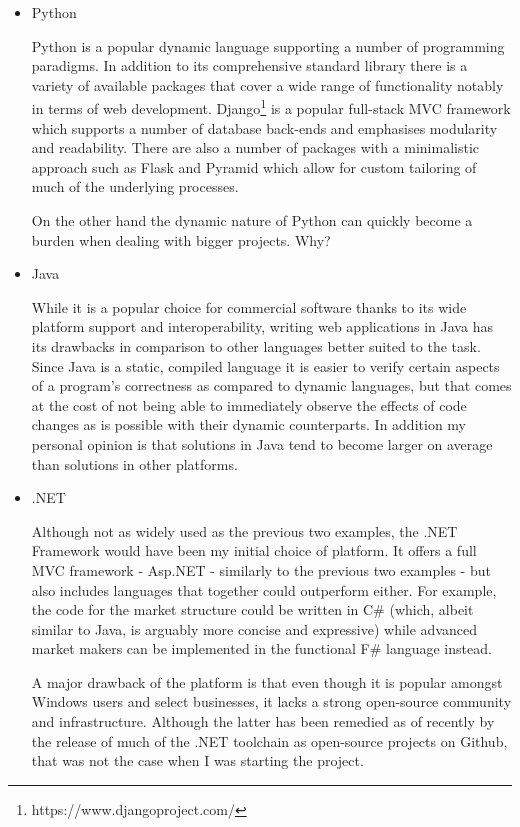 \documentclass[bsc,frontabs,twoside,singlespacing,parskip,deptreport]{infthesis}     %
\begin{document}
\begin{itemize}
\item Python

Python is a popular dynamic language supporting a number of programming paradigms. In addition to its comprehensive standard library there is a variety of available packages that cover a wide range of functionality notably in terms of web development. Django\footnote{https://www.djangoproject.com/} is a popular full-stack MVC framework which supports a number of database back-ends and emphasises modularity and readability. There are also a number of packages with a minimalistic approach such as Flask and Pyramid which allow for custom tailoring of much of the underlying processes.

On the other hand the dynamic nature of Python can quickly become a burden when dealing with bigger projects. Why?

\item Java

While it is a popular choice for commercial software thanks to its wide platform support and interoperability, writing web applications in Java has its drawbacks in comparison to other languages better suited to the task. Since Java is a static, compiled language it is easier to verify certain aspects of a program's correctness as compared to dynamic languages, but that comes at the cost of not being able to immediately observe the effects of code changes as is possible with their dynamic counterparts. In addition my personal opinion is that solutions in Java tend to become larger on average than solutions in other platforms.

\item .NET

    Although not as widely used as the previous two examples, the .NET Framework would have been my initial choice of platform. It offers a full MVC framework - Asp.NET -  similarly to the previous two examples - but also includes languages that together could outperform either. For example, the code for the market structure could be written in C\# (which, albeit similar to Java, is arguably more concise and expressive) while advanced market makers can be implemented in the functional F\# language instead.

    A major drawback of the platform is that even though it is popular amongst Windows users and select businesses, it lacks a strong open-source community and infrastructure. Although the latter has been remedied as of recently by the release of much of the .NET toolchain as open-source projects on Github, that was not the case when I was starting the project.

\end{itemize}
\end{document}
